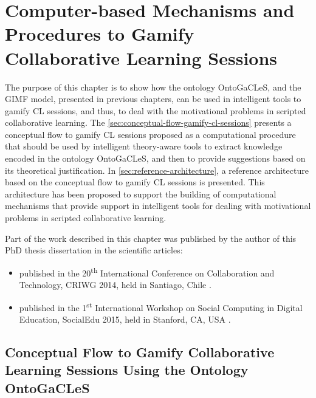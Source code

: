 \chapter[Computer-based Mechanisms and Procedures to Gamify CL Sessions]{Computer-based Mechanisms and Procedures to Gamify Collaborative Learning Sessions}
\label{chapter:computer-based-mechanisms-procedures}

The purpose of this chapter is to show how the ontology OntoGaCLeS, and the GIMF model, presented in previous chapters, can be used in intelligent tools to gamify CL sessions, and thus, to deal with the motivational problems in scripted collaborative learning.
The \autoref{sec:conceptual-flow-gamify-cl-sessions} presents a conceptual flow to gamify CL sessions proposed as a computational procedure that should be used by intelligent theory-aware tools to extract knowledge encoded in the ontology OntoGaCLeS, and then to provide suggestions based on its theoretical justification.
In \autoref{sec:reference-architecture}, a reference architecture based on the conceptual flow to gamify CL sessions is presented.
This architecture has been proposed to support the building of computational mechanisms that provide support in intelligent tools for dealing with motivational problems in scripted collaborative learning.

Part of the work described in this chapter was published by the author of this PhD thesis dissertation in the scientific
articles:

\begin{itemize}
\item {} published in the 20\textsuperscript{th} International Conference on Collaboration and Technology, CRIWG 2014, held in Santiago, Chile \cite{ChallcoMoreiraMizoguchiIsotani2014}.

\item {} published in the 1\textsuperscript{st} International Workshop on Social Computing in Digital Education, SocialEdu 2015, held in Stanford, CA, USA \cite{ChallcoMizoguchiBittencourtIsotani2016}.
\end{itemize}

\section[Conceptual Flow to Gamify CL Sessions Using the Ontology OntoGaCLeS]{Conceptual Flow to Gamify Collaborative Learning Sessions Using the Ontology OntoGaCLeS}
\label{sec:conceptual-flow-gamify-cl-sessions}

